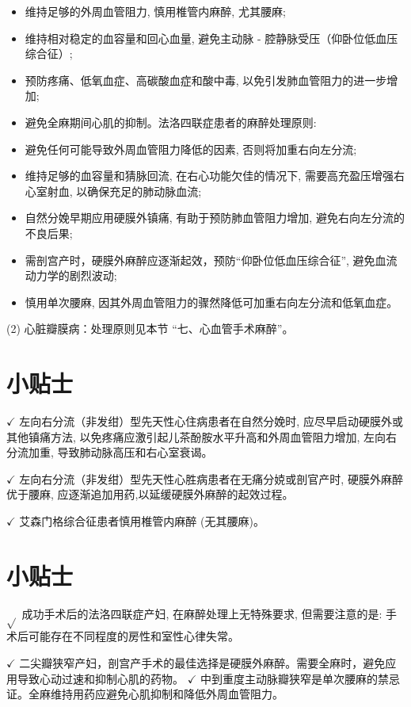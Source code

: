 \documentclass[10pt]{article}
\begin{document}
\begin{itemize}
  \item 维持足够的外周血管阻力, 慎用椎管内麻醉, 尤其腰麻;
  \item 维持相对稳定的血容量和回心血量, 避免主动脉 - 腔静脉受压（仰卧位低血压综合征）;
  \item 预防疼痛、低氧血症、高碳酸血症和酸中毒, 以免引发肺血管阻力的进一步增加;
  \item 避免全麻期间心肌的抑制。法洛四联症患者的麻醉处理原则:
  \item 避免任何可能导致外周血管阻力降低的因素, 否则将加重右向左分流;
  \item 维持足够的血容量和猜脉回流, 在右心功能欠佳的情况下, 需要高充盈压增强右心室射血, 以确保充足的肺动脉血流;
  \item 自然分娩早期应用硬膜外镇痛, 有助于预防肺血管阻力增加, 避免右向左分流的不良后果;
  \item 需剖宫产时，硬膜外麻醉应逐渐起效，预防“仰卧位低血压综合征”, 避免血流动力学的剧烈波动;
  \item 慎用单次腰麻, 因其外周血管阻力的骤然降低可加重右向左分流和低氧血症。
\end{itemize}

(2) 心脏瓣膜病：处理原则见本节 “七、心血管手术麻醉”。

\section*{小贴士}
$\checkmark$ 左向右分流（非发绀）型先天性心住病患者在自然分娩时, 应尽早启动硬膜外或其他镇痛方法, 以免疼痛应激引起儿茶酚胺水平升高和外周血管阻力增加, 左向右分流加重, 导致肺动脉高压和右心室衰谒。

$\checkmark$ 左向右分流（非发绀）型先天性心胜病患者在无痛分娔或剖官产时, 硬膜外麻醉优于腰麻, 应逐渐追加用药,以延缓硬膜外麻醉的起效过程。

$\checkmark$ 艾森门格综合征患者慎用椎管内麻醉 (无其腰麻)。

\section*{小贴士}
$\sqrt{ }$ 成功手术后的法洛四联症产妇, 在麻醉处理上无特殊要求, 但需要注意的是: 手术后可能存在不同程度的房性和室性心律失常。

$\checkmark$ 二尖瓣狭窄产妇，剖宫产手术的最佳选择是硬膜外麻醉。需要全麻时，避免应用导致心动过速和抑制心肌的药物。 $\checkmark$ 中到重度主动脉瓣狭窄是单次腰麻的禁忌证。全麻维持用药应避免心肌抑制和降低外周血管阻力。
\end{document}
